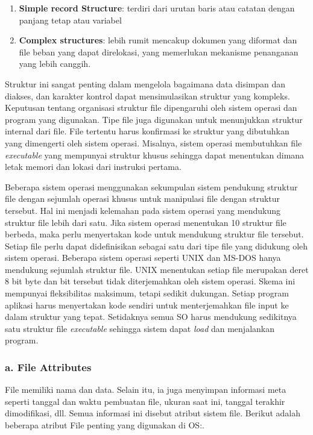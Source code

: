 \documentclass[12pt]{article}
\begin{document}
\begin{enumerate}
    \item \textbf{Simple record Structure}: terdiri dari urutan baris atau catatan dengan panjang tetap atau variabel
    \item \textbf{Complex structures}: lebih rumit mencakup dokumen yang diformat dan file beban yang dapat direlokasi, yang memerlukan mekanisme penanganan yang lebih canggih.
\end{enumerate}

Struktur ini sangat penting dalam mengelola bagaimana data disimpan dan diakses, dan karakter kontrol dapat mensimulasikan struktur yang kompleks. Keputusan tentang organisasi struktur file dipengaruhi oleh sistem operasi dan program yang digunakan. Tipe file juga digunakan untuk menunjukkan struktur internal dari file. File tertentu harus konfirmasi ke struktur yang dibutuhkan yang dimengerti oleh sistem operasi. Misalnya, sistem operasi membutuhkan file \textit{executable} yang mempunyai struktur khusus sehingga dapat menentukan dimana letak memori dan lokasi dari instruksi pertama.

Beberapa sistem operasi menggunakan sekumpulan sistem pendukung struktur file dengan sejumlah operasi khusus untuk manipulasi file dengan struktur tersebut. Hal ini menjadi kelemahan pada sistem operasi yang mendukung struktur file lebih dari satu. Jika sistem operasi menentukan 10 struktur file berbeda, maka perlu menyertakan kode untuk mendukung struktur file tersebut. Setiap file perlu dapat didefinisikan sebagai satu dari tipe file yang didukung oleh sistem operasi. Beberapa sistem operasi seperti UNIX dan MS-DOS hanya mendukung sejumlah struktur file. UNIX menentukan setiap file merupakan deret 8 bit byte dan bit tersebut tidak diterjemahkan oleh sistem operasi. Skema ini mempunyai fleksibilitas maksimum, tetapi sedikit dukungan. Setiap program aplikasi harus menyertakan kode sendiri untuk menterjemahkan file input ke dalam struktur yang tepat. Setidaknya semua SO harus mendukung sedikitnya satu struktur file \textit{executable} sehingga sistem dapat \textit{load} dan menjalankan program.

\subsubsection*{a. File Attributes }
File memiliki nama dan data. Selain itu, ia juga menyimpan informasi meta seperti tanggal dan waktu pembuatan file, ukuran saat ini, tanggal terakhir dimodifikasi, dll. Semua informasi ini disebut atribut sistem file. Berikut adalah beberapa atribut File penting yang digunakan di OS:.
\end{document}
